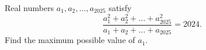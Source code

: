 Real numbers $a_{1}, a_{2}, \ldots, a_{2025}$ satisfy \[\dfrac{a_{1}^{2}+a_{2}^{2}+\ldots+a_{2025}^{2}}{a_{1}+a_{2}+\ldots+a_{2025}}=2024.\]Find the maximum possible value of $a_{1}$.
